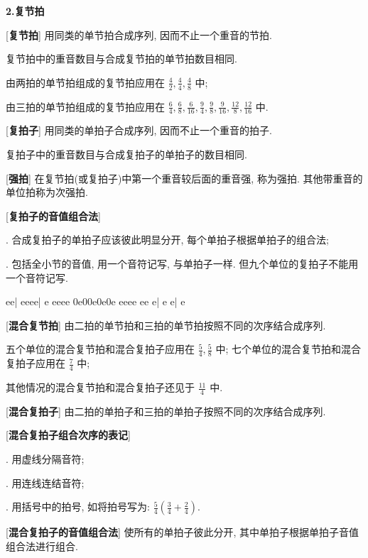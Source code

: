 \clearpage

\begin{center}
 \textbf{2.复节拍}\\
\end{center}

[\textbf{复节拍}] 用同类的单节拍合成序列, 因而不止一个重音的节拍.\par
\qquad 复节拍中的重音数目与合成复节拍的单节拍数目相同.\par
\qquad 由两拍的单节拍组成的复节拍应用在 $\frac{4}{2}, \frac{4}{4}, \frac{4}{8}$ 中;\par
\qquad 由三拍的单节拍组成的复节拍应用在 $\frac{6}{4}, \frac{6}{8}, \frac{6}{16}, \frac{9}{4}, \frac{9}{8}, \frac{9}{16}, \frac{12}{8}, \frac{12}{16}$ 中.\par

[\textbf{复拍子}] 用同类的单拍子合成序列, 因而不止一个重音的拍子.\par
\qquad 复拍子中的重音数目与合成复拍子的单拍子的数目相同.\par

[\textbf{强拍}] 在复节拍(或复拍子)中第一个重音较后面的重音强, 称为强拍. 其他带重音的单位拍称为次强拍.\par

[\textbf{复拍子的音值组合法}] \par
{}. 合成复拍子的单拍子应该彼此明显分开, 每个单拍子根据单拍子的组合法;\par
{}. 包括全小节的音值, 用一个音符记写, 与单拍子一样. 但九个单位的复拍子不能用一个音符记写.\par
{}
\startextract
\Notes \ha e\ha e\en\bar
\Notes \qa e\qa e\qa e\qa e\en\bar
\Notes \ha e \Qqbu eeee\en
\zendextract
\startextract {}
\Notes \ibu0e0\qb0e\qb0e\qb0e \Qqbbu eeee \Dqbu ee \qa e\en\bar
\Notes {} \ca e \ha e\en\bar
\Notes \wh e\en
\zendextract

[\textbf{混合复节拍}] 由二拍的单节拍和三拍的单节拍按照不同的次序结合成序列.\par
\qquad 五个单位的混合复节拍和混合复拍子应用在 $\frac{5}{4}, \frac{5}{8}$ 中;
\qquad 七个单位的混合复节拍和混合复拍子应用在 $\frac{7}{4}$ 中;\par
\qquad 其他情况的混合复节拍和混合复拍子还见于 $\frac{11}{4}$ 中.\par

[\textbf{混合复拍子}] 由二拍的单拍子和三拍的单拍子按照不同的次序结合成序列.\par

[\textbf{混合复拍子组合次序的表记}]\par
{}. 用虚线分隔音符;\par
{}. 用连线连结音符;\par
{}. 用括号中的拍号, 如将拍号写为: $\frac{5}{4} \left(\frac{3}{4}+\frac{2}{4}\right)$.\par

[\textbf{混合复拍子的音值组合法}] 使所有的单拍子彼此分开, 其中单拍子根据单拍子音值组合法进行组合.\par


